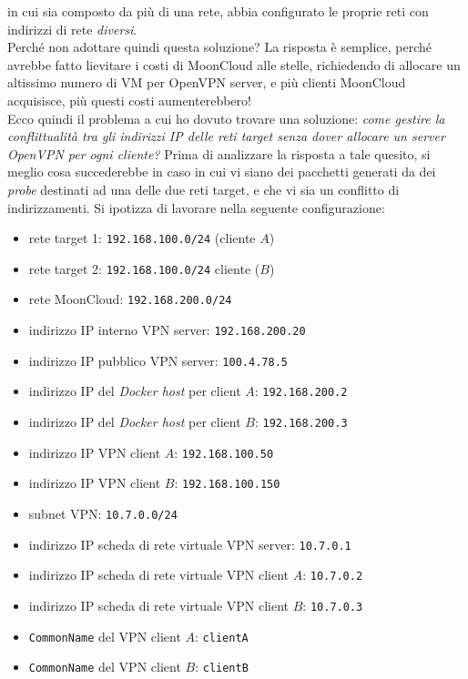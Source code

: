 in cui sia composto da più di una rete, abbia configurato le proprie reti con indirizzi
di rete \textit{diversi}.\\
Perché non adottare quindi questa soluzione? La risposta è semplice, perché avrebbe
fatto lievitare i costi di MoonCloud alle stelle, richiedendo di allocare un altissimo
numero di VM per OpenVPN server, e più clienti MoonCloud acquisisce, più questi
costi aumenterebbero!\\
Ecco quindi il problema a cui ho dovuto trovare una soluzione: \textit{come gestire
la conflittualità tra gli indirizzi IP delle reti target senza dover allocare un
server OpenVPN per ogni cliente?}
Prima di analizzare la risposta a tale quesito, si meglio cosa succederebbe in caso in cui
vi siano dei pacchetti generati da dei \textit{probe} destinati ad una delle due reti target,
e che vi
sia un conflitto di indirizzamenti. Si ipotizza di lavorare nella seguente
configurazione:
\begin{itemize}
  \item rete target 1: \texttt{192.168.100.0/24} (cliente $A$)
  \item rete target 2: \texttt{192.168.100.0/24} cliente ($B$)
  \item rete MoonCloud: \texttt{192.168.200.0/24}
  \item indirizzo IP interno VPN server: \texttt{192.168.200.20}
  \item indirizzo IP pubblico VPN server: \texttt{100.4.78.5}
  \item indirizzo IP del \textit{Docker host} per client $A$: \texttt{192.168.200.2}
  \item indirizzo IP del \textit{Docker host} per client $B$: \texttt{192.168.200.3}
  \item indirizzo IP VPN client $A$: \texttt{192.168.100.50}
  \item indirizzo IP VPN client $B$: \texttt{192.168.100.150}
  \item subnet VPN: \texttt{10.7.0.0/24}
  \item indirizzo IP scheda di rete virtuale VPN server: \texttt{10.7.0.1}
  \item indirizzo IP scheda di rete virtuale VPN client $A$: \texttt{10.7.0.2}
  \item indirizzo IP scheda di rete virtuale VPN client $B$: \texttt{10.7.0.3}
  \item \texttt{CommonName} del VPN client $A$: \texttt{clientA}
  \item \texttt{CommonName} del VPN client $B$: \texttt{clientB}
\end{itemize}
